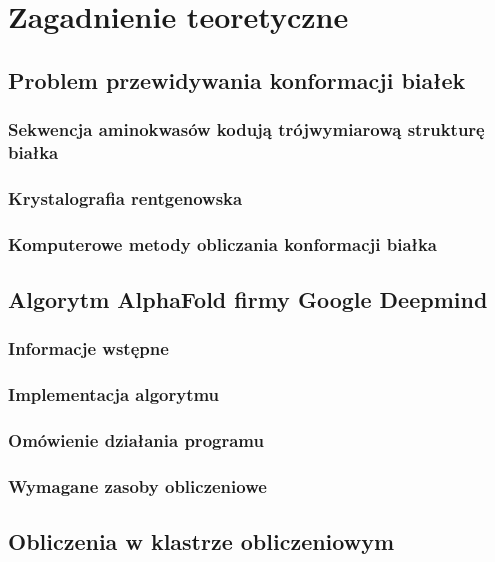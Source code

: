 \chapter{Zagadnienie teoretyczne}


\section{Problem przewidywania konformacji białek}

\subsection{Sekwencja aminokwasów kodują trójwymiarową strukturę białka}

\subsection{Krystalografia rentgenowska}

\subsection{Komputerowe metody obliczania konformacji białka}


\section{Algorytm AlphaFold firmy Google Deepmind}

\subsection{Informacje wstępne}

\subsection{Implementacja algorytmu}

\subsection{Omówienie działania programu}

\subsection{Wymagane zasoby obliczeniowe}


\section{Obliczenia w klastrze obliczeniowym}


